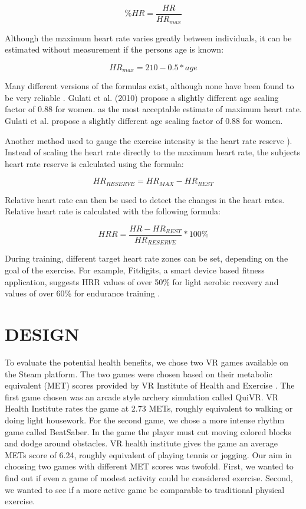 \documentclass{sig-alternate-05-2015}
\begin{document}
\begin{equation}\%HR = \frac{HR}{HR_{max}}\end{equation}

Although the maximum heart rate varies greatly between individuals, 
it can be estimated without measurement if the persons age is known:

\begin{equation}HR_{max} = 210 - 0.5 * age\end{equation}

Many different versions of the formulas exist, although none have been found 
to be very reliable \cite{robergs2002surprising}. Gulati et al. (2010) propose a slightly different age scaling factor of 0.88 for women.
as the most acceptable estimate of maximum heart rate. Gulati et al. \cite{gulati2005heart} 
propose a slightly different age scaling factor of 0.88 for women.

Another method used to gauge the exercise intensity is the heart rate reserve 
\cite{karvonen1957effects}). Instead of scaling the heart rate directly to the 
maximum heart rate, the subjects heart rate reserve is calculated using the formula:

\begin{equation}HR_{RESERVE} = HR_{MAX} - HR_{REST}\end{equation}

Relative heart rate can then be used to detect the changes in the heart rates. 
Relative heart rate is calculated with the following formula:

\begin{equation}HRR = \frac{HR - HR_{REST}}{HR_{RESERVE}} * 100\%\end{equation}

During training, different target heart rate zones can be set, depending on the 
goal of the exercise. For example, Fitdigits, a smart device based fitness application, 
suggests HRR values of over 50\% for light aerobic recovery and values of over 60\% 
for endurance training \cite{fitdigits}.  

\section{DESIGN}
To evaluate the potential health benefits, we chose two VR games available on the Steam 
platform. The two games were chosen based on their metabolic equivalent (MET) scores 
provided by VR Institute of Health and Exercise \cite{vrhealth_met}. The first game 
chosen was an arcade style archery simulation called QuiVR. VR Health Institute rates 
the game at 2.73 METs, roughly equivalent to walking or doing light housework. For the 
second game, we chose a more intense rhythm game called BeatSaber. In the game the player 
must cut moving colored blocks and dodge around obstacles. VR health institute gives the 
game an average METs score of 6.24, roughly equivalent of playing tennis or jogging. 
Our aim in choosing two games with different MET scores was twofold. First, we wanted to 
find out if even a game of modest activity could be considered exercise. Second, we wanted 
to see if a more active game be comparable to traditional physical exercise. 
\end{document}
